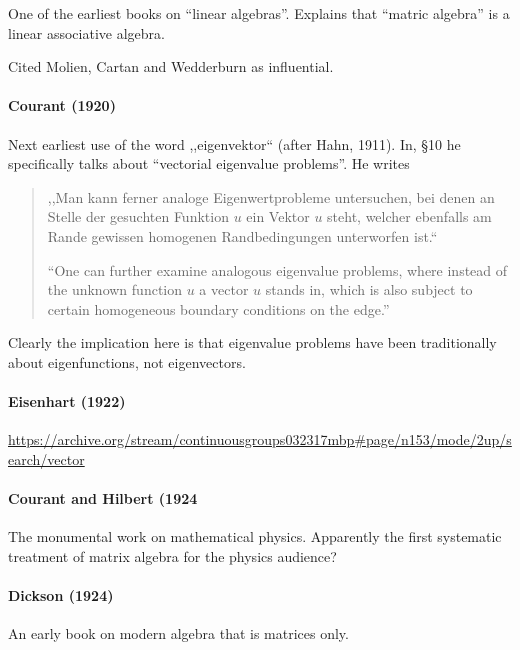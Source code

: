 One of the earliest books on ``linear algebras''.
Explains that ``matric algebra'' is a linear associative algebra.

Cited Molien, Cartan and Wedderburn as influential.


\paragraph{Courant (1920)~\cite{Courant1920}}

Next earliest use of the word ,,eigenvektor`` (after Hahn, 1911).
In, \S 10 he specifically talks about ``vectorial eigenvalue problems''. He
writes

\begin{quote}
,,Man kann ferner analoge Eigenwertprobleme untersuchen, bei denen an Stelle
der gesuchten Funktion $u$ ein Vektor $u$ steht, welcher ebenfalls am Rande
gewissen homogenen Randbedingungen unterworfen ist.``

``One can further examine analogous eigenvalue problems, where instead of the
unknown function $u$ a vector $u$ stands in, which is also subject to certain
homogeneous boundary conditions on the edge.''
\end{quote}

Clearly the implication here is that eigenvalue problems have been
traditionally about eigenfunctions, not eigenvectors.



\paragraph{Eisenhart (1922)}

\url{https://archive.org/stream/continuousgroups032317mbp#page/n153/mode/2up/search/vector}

\paragraph{Courant and Hilbert (1924~\cite{Courant1924}}

The monumental work on mathematical physics. Apparently the first systematic treatment of matrix algebra for the physics audience?



\paragraph{Dickson (1924)~\cite{Dickson1924}}

An early book on modern algebra that is matrices only.

